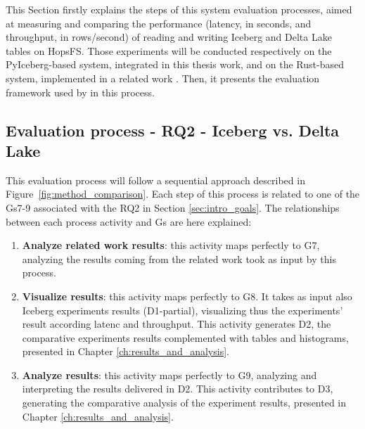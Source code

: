 This Section firstly explains the steps of this system evaluation processes, aimed at measuring and comparing the performance (latency, in seconds, and throughput, in rows/second) of reading and writing Iceberg and Delta Lake tables on \gls{HopsFS}. Those experiments will be conducted respectively on the PyIceberg-based system, integrated in this thesis work, and on the Rust-based system, implemented in a related work \cite{manfrediReducingReadWrite2024}. Then, it presents the evaluation framework used by in this process.



\subsection{Evaluation process - RQ2 - Iceberg vs. Delta Lake}
\label{subsec:eval_process_iceberg_delta}
This evaluation process will follow a sequential approach described in Figure~\ref{fig:method_comparison}. Each step of this process is related to one of the \glspl{G}7-9 associated with the \gls{RQ}2 in Section \ref{sec:intro_goals}. The relationships between each process activity and \glspl{G} are here explained:
\begin{enumerate}
    \item \textbf{Analyze related work results}: this activity maps perfectly to \gls{G}7, analyzing the results coming from the related work took as input by this process.
    \item \textbf{Visualize results}: this activity maps perfectly to \gls{G}8. It takes as input also Iceberg experiments results (\gls{D}1-partial), visualizing thus the experiments' result according latenc and throughput. This activity generates \gls{D}2, the comparative experiments results complemented with tables and histograms, presented in Chapter \ref{ch:results_and_analysis}.
    \item \textbf{Analyze results}: this activity maps perfectly to \gls{G}9, analyzing and interpreting the results delivered in \gls{D}2. This activity contributes to \gls{D}3, generating the comparative analysis of the experiment results, presented in Chapter \ref{ch:results_and_analysis}.
\end{enumerate}
